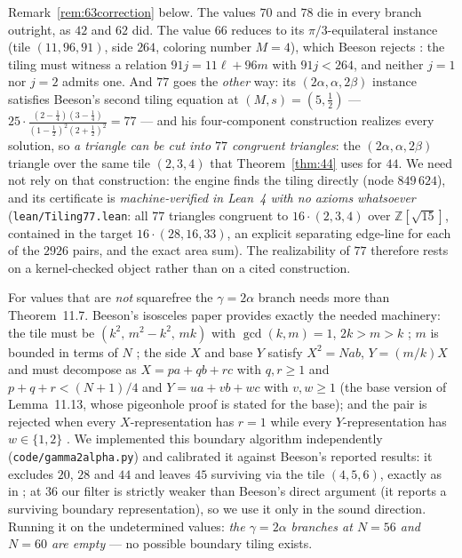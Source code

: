 \documentclass[11pt,reqno]{amsart}
\theoremstyle{plain}
\theoremstyle{definition}
\newcommand{\Z}{\mathbb{Z}}
\begin{document}
Remark~\ref{rem:63correction} below. The values $70$
and $78$ die in every branch outright, as $42$ and $62$ did. The value $66$ reduces to its
$\pi/3$-equilateral instance (tile $(11,96,91)$, side $264$, coloring number $M=4$), which Beeson
rejects \cite[Thm.~7]{BeesonEq}: the tiling must witness a relation $91j=11\ell+96m$ with
$91j<264$, and neither $j=1$ nor $j=2$ admits one. And $77$ goes the \emph{other} way: its
$(2\alpha,\alpha,2\beta)$ instance satisfies Beeson's second tiling equation at
$(M,s)=(5,\tfrac12)$ --- $25\cdot\frac{(2-\frac14)(3-\frac14)}{(1-\frac12)^2(2+\frac12)^2}=77$ ---
and his four-component construction \cite{BeesonIII} realizes every solution, so \emph{a triangle
can be cut into $77$ congruent triangles}: the $(2\alpha,\alpha,2\beta)$ triangle over the same
tile $(2,3,4)$ that Theorem~\ref{thm:44} uses for $44$. We need not rely on that construction: the
engine finds the tiling directly (node $849\,624$), and its certificate is \emph{machine-verified in
Lean~4 with no axioms whatsoever} (\texttt{lean/Tiling77.lean}: all $77$ triangles congruent to
$16\cdot(2,3,4)$ over $\Z[\sqrt{15}]$, contained in the target $16\cdot(28,16,33)$, an explicit
separating edge-line for each of the $2926$ pairs, and the exact area sum). The realizability of
$77$ therefore rests on a kernel-checked object rather than on a cited construction.

For values that are \emph{not} squarefree the $\gamma=2\alpha$ branch needs more than
Theorem~11.7. Beeson's isosceles paper provides exactly the needed machinery: the tile must be
$(k^2,\,m^2{-}k^2,\,mk)$ with $\gcd(k,m)=1$, $2k>m>k$ \cite[Lem.~11.2]{BeesonIso}; $m$ is bounded
in terms of $N$ \cite[Lem.~11.12]{BeesonIso}; the side $X$ and base $Y$ satisfy $X^2=Nab$,
$Y=(m/k)X$ and must decompose as $X=pa+qb+rc$ with $q,r\ge1$ and $p+q+r<(N{+}1)/4$
\cite[Lems.~11.11, 11.13]{BeesonIso} and $Y=ua+vb+wc$ with $v,w\ge1$ (the base version of
Lemma~11.13, whose pigeonhole proof is stated for the base); and the pair is rejected when every
$X$-representation has $r=1$ while every $Y$-representation has $w\in\{1,2\}$
\cite[Lem.~11.17]{BeesonIso}. We implemented this boundary algorithm independently
(\texttt{code/gamma2alpha.py}) and calibrated it against Beeson's reported results: it excludes
$20$, $28$ and $44$ and leaves $45$ surviving via the tile $(4,5,6)$, exactly as in
\cite[Thm.~11.18]{BeesonIso}; at $36$ our filter is strictly weaker than Beeson's direct argument
(it reports a surviving boundary representation), so we use it only in the sound direction.
Running it on the undetermined values: \emph{the $\gamma=2\alpha$ branches at $N=56$ and $N=60$
are empty} --- no possible boundary tiling exists.
\end{document}
